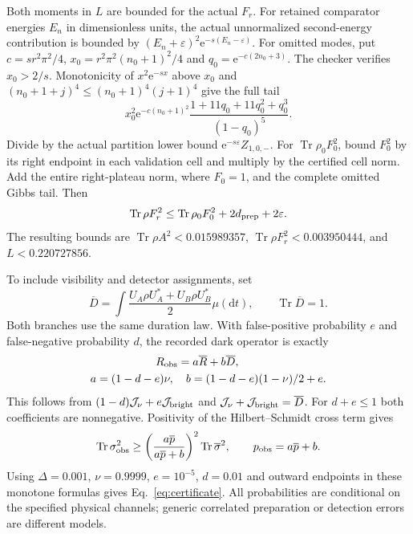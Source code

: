 \documentclass[aps,pra,reprint,superscriptaddress,longbibliography]{revtex4-2}
\newcommand{\Tr}{\operatorname{Tr}}
\newcommand{\dd}{\mathrm d}
\newcommand{\ee}{\mathrm e}
\begin{document}
Both moments in $L$ are bounded for the actual $F_r$. For retained
comparator energies $E_n$ in dimensionless units, the actual
unnormalized second-energy contribution is bounded by
$(E_n+\varepsilon)^2\ee^{-s(E_n-\varepsilon)}$.
For omitted modes, put
$c=sr^2\pi^2/4$, $x_0=r^2\pi^2(n_0+1)^2/4$ and
$q_0=\ee^{-c(2n_0+3)}$. The checker verifies $x_0>2/s$.
Monotonicity of $x^2\ee^{-sx}$ above $x_0$ and
$(n_0+1+j)^4\le(n_0+1)^4(j+1)^4$ give the full tail
\begin{equation}
 x_0^2\ee^{-c(n_0+1)^2}
              \frac{1+11q_0+11q_0^2+q_0^3}{(1-q_0)^5}.
                                                               \label{eq:momenttail}
\end{equation}
Divide by the actual partition lower bound
$\ee^{-s\varepsilon}Z_{1,0,-}$. For $\Tr\rho_0F_0^2$, bound
$F_0^2$ by its right endpoint in each validation cell and multiply
by the certified cell norm. Add the entire right-plateau norm,
where $F_0=1$, and the complete omitted Gibbs tail.
Then
\begin{equation}
 \Tr\rho F_r^2\le\Tr\rho_0F_0^2+2d_{\rm prep}+2\varepsilon.
\end{equation}
The resulting bounds are
$\Tr\rho A^2<0.015989357$, $\Tr\rho F_r^2<0.003950444$,
and $L<0.220727856$.

To include visibility and detector assignments, set
\begin{equation}
 \overline D=\int\frac{U_A\rho U_A^*+U_B\rho U_B^*}{2}\mu(\dd t),
 \qquad\Tr\overline D=1.
\end{equation}
Both branches use the same duration law. With false-positive
probability $e$ and false-negative probability $d$, the recorded
dark operator is exactly
\begin{equation}
 \begin{gathered}
 R_{\rm obs}=a\overline R+b\overline D,\qquad\\
 a=(1-d-e)\nu,\quad b=(1-d-e)(1-\nu)/2+e.                     \label{eq:recordedmap}
 \end{gathered}
\end{equation}
This follows from $(1-d)\mathcal J_\nu+e\mathcal J_{\rm bright}$
and $\mathcal J_\nu+\mathcal J_{\rm bright}=\overline D$.
For $d+e\le1$ both coefficients are nonnegative. Positivity
of the Hilbert--Schmidt cross term gives
\begin{equation}
 \Tr\sigma_{\rm obs}^2\ge
 \left(\frac{a\overline p}{a\overline p+b}\right)^2
                  \Tr\overline\sigma^2,
 \qquad p_{\rm obs}=a\overline p+b.                          \label{eq:recordedpurity}
\end{equation}
Using $\Delta=0.001$, $\nu=0.9999$, $e=10^{-5}$, $d=0.01$
and outward endpoints in these monotone formulas gives
Eq.~\eqref{eq:certificate}. All probabilities are conditional
on the specified physical channels; generic correlated preparation
or detection errors are different models.
\end{document}
